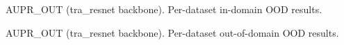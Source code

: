 \documentclass[runningheads]{llncs}
\begin{document}
\begin{table}[htbp]
  \centering
  \caption{AUPR\_OUT (tra\_resnet backbone). Per-dataset in-domain OOD results.}
  \label{tab:supp:extended:auprout:tra_resnet:in}
  \small
  \resizebox{\linewidth}{!}{}
\end{table}

\begin{table}[htbp]
  \centering
  \caption{AUPR\_OUT (tra\_resnet backbone). Per-dataset out-of-domain OOD results.}
  \label{tab:supp:extended:auprout:tra_resnet:out}
  \small
  \resizebox{\linewidth}{!}{}
\end{table}

\endgroup



\end{document}
